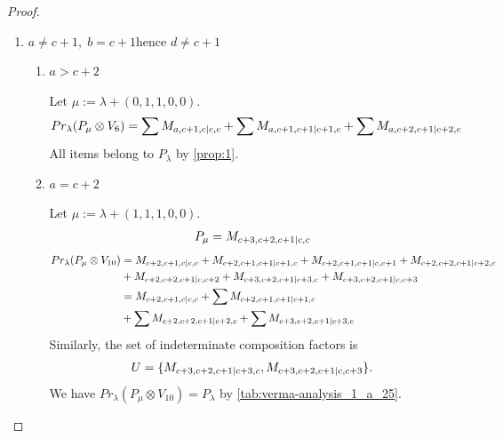 \begin{proof}
\begin{enumerate}
      \item $a\neq c+1, \; b=c+1 \text{hence } d \neq c+1 $
        \begin{enumerate}
          \item $ a>c+2 $\par
        Let $\mu:=\lambda + (0,1,1,0,0) $.
        \begin{equation}\notag
          \begin{aligned}
            Pr_{\lambda}(P_\mu \otimes V_{6}) &=
\sum M_{a,c+1,c|c,c}
+ \sum M_{a,c+1,c+1|c+1,c}
+ \sum M_{a,c+2,c+1|c+2,c}
          \end{aligned}
        \end{equation}
All items belong to $P_\lambda$ by \cref{prop:1}.

          \item $a=c+2$ \par
        Let $\mu:=\lambda + (1,1,1,0,0) $.
        \begin{equation}\notag
          \begin{aligned}
            P_\mu = M_{c+3,c+2,c+1|c,c}
          \end{aligned}
        \end{equation}
        \begin{equation}\notag
          \begin{aligned}
            Pr_{\lambda}(P_\mu \otimes V_{10}) &=
M_{c+2,c+1,c|c,c}
+ M_{c+2,c+1,c+1|c+1,c}
+ M_{c+2,c+1,c+1|c,c+1}
+ M_{c+2,c+2,c+1|c+2,c}\\
                                               &
+ M_{c+2,c+2,c+1|c,c+2}
+ M_{c+3,c+2,c+1|c+3,c}
+ M_{c+3,c+2,c+1|c,c+3} \\
                                               &=
 M_{c+2,c+1,c|c,c}
+ \sum M_{c+2,c+1,c+1|c+1,c}\\
                                               &
+ \sum M_{c+2,c+2,c+1|c+2,c}
+ \sum M_{c+3,c+2,c+1|c+3,c}
          \end{aligned}
        \end{equation}
      Similarly, the set of indeterminate composition factors is 
\begin{equation}\notag
  \begin{aligned}
    U = \{
M_{c+3,c+2,c+1|c+3,c},
M_{c+3,c+2,c+1|c,c+3}
\}.
  \end{aligned}
\end{equation}
       We have $Pr_{\lambda}(P_\mu \otimes V_{10}) = P_\lambda  $ by \cref{tab:verma-analysis_1_a_25}.
\begin{table}[htbp]

\end{table}
\end{enumerate}
\end{enumerate}
\end{proof}
